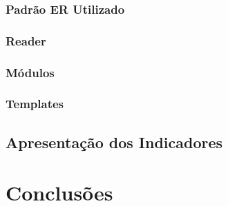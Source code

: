 \documentclass[runningheads]{llncs}
\begin{document}
\subsubsection{Padrão ER Utilizado} \label{subsubsec:padrao}



\subsubsection{Reader}\label{subsubsec:reader}



\subsubsection{Módulos}\label{subsubsec:modulos}



\subsubsection{Templates} \label{subsubsec:templates}



\subsection{Apresentação dos Indicadores} \label{subsec:indicadores}



\section{Conclusões} 



%
%
%
% 
% 


\end{document}

